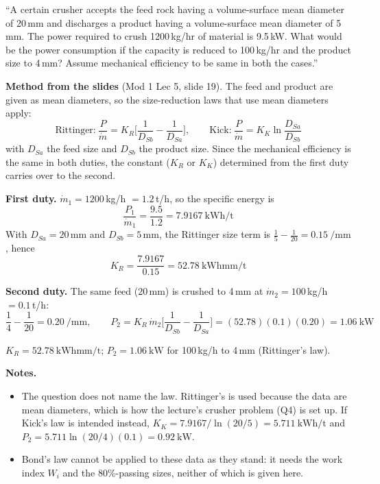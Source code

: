 \documentclass[10pt,a4paper]{article}
\newcommand{\spsub}[1]{\par\addvspace{7pt}\noindent{\color{accent}\bfseries #1}\par\addvspace{3pt}\nopagebreak}
\begin{document}
\begin{qbox}
``A certain crusher accepts the feed rock having a volume-surface mean diameter of 20\,mm and
discharges a product having a volume-surface mean diameter of 5\,mm. The power required to crush
1200\,kg/hr of material is 9.5\,kW. What would be the power consumption if the capacity is reduced
to 100\,kg/hr and the product size to 4\,mm? Assume mechanical efficiency to be same in both the
cases.''
\end{qbox}

\begin{mthbox}
\textbf{Method from the slides} (Mod 1 Lec 5, slide 19). The feed and product are given as mean
diameters, so the size-reduction laws that use mean diameters apply:
\[
\text{Rittinger:}\ \frac{P}{\dot m}=K_R\Big[\frac{1}{D_{Sb}}-\frac{1}{D_{Sa}}\Big],
\qquad
\text{Kick:}\ \frac{P}{\dot m}=K_K\ln\frac{D_{Sa}}{D_{Sb}}
\]
with $D_{Sa}$ the feed size and $D_{Sb}$ the product size. Since the mechanical efficiency is the
same in both duties, the constant ($K_R$ or $K_K$) determined from the first duty carries over to
the second.
\end{mthbox}

\spsub{Solution}
\textbf{First duty.} $\dot m_1=1200$\,kg/h $=1.2$\,t/h, so the specific energy is
\[
\frac{P_1}{\dot m_1}=\frac{9.5}{1.2}=\SI{7.9167}{\kilo\watt\hour\per\tonne}
\]
With $D_{Sa}=20$\,mm and $D_{Sb}=5$\,mm, the Rittinger size term is
$\frac{1}{5}-\frac{1}{20}=\SI{0.15}{\per\milli\meter}$, hence
\[
K_R=\frac{7.9167}{0.15}=\SI{52.78}{\kilo\watt\hour\milli\meter\per\tonne}
\]

\textbf{Second duty.} The same feed (20\,mm) is crushed to 4\,mm at $\dot m_2=100$\,kg/h
$=0.1$\,t/h:
\[
\frac{1}{4}-\frac{1}{20}=\SI{0.20}{\per\milli\meter},\qquad
P_2=K_R\,\dot m_2\Big[\frac{1}{D_{Sb}}-\frac{1}{D_{Sa}}\Big]
=(52.78)(0.1)(0.20)=\SI{1.06}{\kilo\watt}
\]

\begin{ansbox}
$K_R=\SI{52.78}{\kilo\watt\hour\milli\meter\per\tonne}$;\qquad
$P_2=\SI{1.06}{\kilo\watt}$ for 100\,kg/h to 4\,mm (Rittinger's law).
\end{ansbox}

\begin{warnbox}
\textbf{Notes.}
\begin{itemize}
  \item The question does not name the law. Rittinger's is used because the data are mean diameters,
        which is how the lecture's crusher problem (Q4) is set up. If Kick's law is intended instead,
        $K_K=7.9167/\ln(20/5)=\SI{5.711}{\kilo\watt\hour\per\tonne}$ and
        $P_2=5.711\ln(20/4)(0.1)=\SI{0.92}{\kilo\watt}$.
  \item Bond's law cannot be applied to these data as they stand: it needs the work index $W_i$ and
        the 80\%-passing sizes, neither of which is given here.
\end{itemize}
\end{warnbox}
\end{document}
